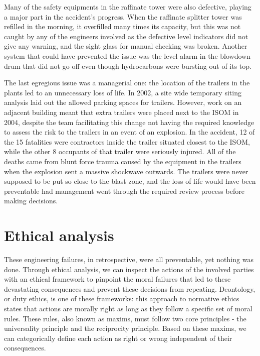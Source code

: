 \documentclass[12pt]{article}
\begin{document}
	Many of the safety equipments in the raffinate tower were also defective, playing a major part in the accident's progress. When the raffinate splitter tower was refilled in the morning, it overfilled many times its capacity, but this was not caught by any of the engineers involved as the defective level indicators did not give any warning, and the sight glass for manual checking was broken.  Another system that could have prevented the issue was the level alarm in the blowdown drum that did not go off even though hydrocarbons were bursting out of its top. 
	
	The last egregious issue was a managerial one: the location of the trailers in the plants led to an unnecessary loss of life. In 2002, a site wide temporary siting analysis laid out the allowed parking spaces for trailers. However, work on an adjacent building meant that extra trailers were placed next to the ISOM in 2004, despite the team facilitating this change not having the required knowledge to assess the risk to the trailers in an event of an explosion. In the accident, 12 of the 15 fatalities were contractors inside the trailer situated closest to the ISOM, while the other 8 occupants of that trailer were seriously injured. All of the deaths came from blunt force trauma caused by the equipment in the trailers when the explosion sent a massive shockwave outwards. The trailers were never supposed to be put so close to the blast zone, and the loss of life would have been preventable had management went through the required review process before making decisions.
	
	\section*{Ethical analysis}
	These engineering failures, in retrospective, were all preventable, yet nothing was done. Through ethical analysis, we can inspect the actions of the involved parties with an ethical framework to  pinpoint the moral failures that led to these devastating consequences and prevent these decisions from repeating. Deontology, or duty ethics, is one of these frameworks: this approach to normative ethics states that actions are morally right as long as they follow a specific set of moral rules. These rules, also known as maxims, must follow two core principles - the universality principle and the reciprocity principle. Based on these maxims, we can categorically define each action as right or wrong independent of their consequences.
	
\end{document}
